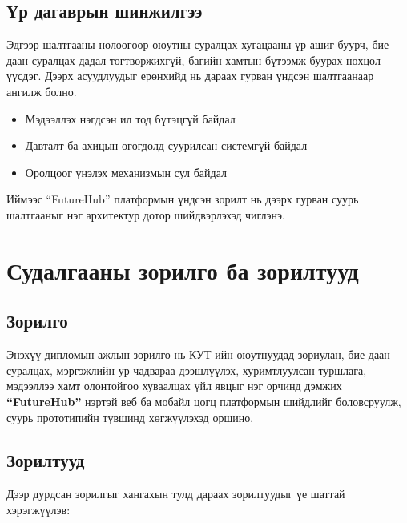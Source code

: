 \subsection{Үр дагаврын шинжилгээ}

Эдгээр шалтгааны нөлөөгөөр оюутны суралцах хугацааны үр ашиг буурч, бие даан суралцах дадал тогтворжихгүй, багийн хамтын бүтээмж буурах нөхцөл үүсдэг. Дээрх асуудлуудыг ерөнхийд нь дараах гурван үндсэн шалтгаанаар ангилж болно.

\begin{itemize}[leftmargin=2em, itemsep=0.3em]
\item Мэдээллэх нэгдсэн ил тод бүтэцгүй байдал
\item Давталт ба ахицын өгөгдөлд суурилсан системгүй байдал
\item Оролцоог үнэлэх механизмын сул байдал
\end{itemize}

Иймээс “FutureHub” платформын үндсэн зорилт нь дээрх гурван суурь шалтгааныг нэг архитектур дотор шийдвэрлэхэд чиглэнэ. 


\section{Судалгааны зорилго ба зорилтууд}

\subsection{Зорилго}

Энэхүү дипломын ажлын зорилго нь КУТ-ийн оюутнуудад зориулан, бие даан суралцах, мэргэжлийн ур чадвараа дээшлүүлэх, хуримтлуулсан туршлага, мэдээллээ хамт олонтойгоо хуваалцах үйл явцыг нэг орчинд дэмжих \textbf{``FutureHub''} нэртэй веб ба мобайл цогц платформын шийдлийг боловсруулж, суурь прототипийн түвшинд хөгжүүлэхэд оршино.

\subsection{Зорилтууд}

Дээр дурдсан зорилгыг хангахын тулд дараах зорилтуудыг үе шаттай хэрэгжүүлэв:

